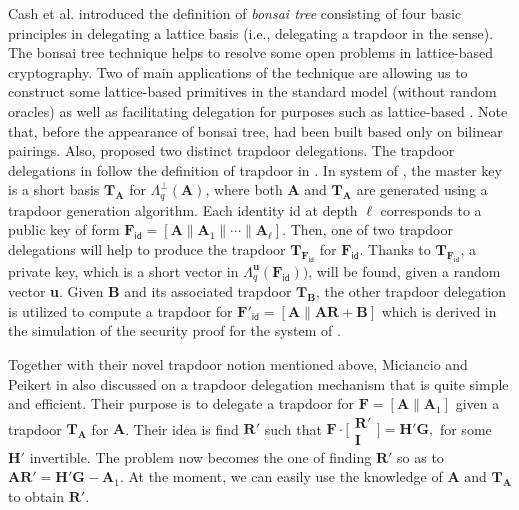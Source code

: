 \documentclass[runningheads]{llncs}
\begin{document}
Cash et al. \cite{CHKP10} introduced the definition of \textit{bonsai tree} consisting of four basic principles in delegating a lattice basis (i.e., delegating a trapdoor in the \cite{GPV08} sense). The bonsai tree technique helps to resolve some open problems in lattice-based cryptography. Two of main applications of the technique are allowing us to construct some lattice-based primitives in the standard model (without random oracles) as well as facilitating delegation for purposes such as lattice-based . Note that, before the appearance of bonsai tree,  had been built based only on bilinear pairings. Also, \cite{ABB10} proposed two distinct trapdoor delegations. The trapdoor delegations in \cite{ABB10} follow the definition of trapdoor in \cite{GPV08}. In  system of \cite{ABB10}, the master key is a short basis $\mathbf{T}_{\textbf{A}}$ for $\Lambda_q^{\bot}(\mathbf{A})$, where both $\textbf{A}$ and $\mathbf{T}_{\textbf{A}}$ are generated using a trapdoor generation algorithm. Each identity \textsf{id} at depth $\ell$ corresponds to a public key of form $\mathbf{F}_{\textsf{id}}=[\mathbf{A}\|\mathbf{A}_1 \|\cdots \| \mathbf{A}_{\ell}]$. Then, one of two trapdoor delegations will help to produce the trapdoor $\mathbf{T}_{\mathbf{F}_{\textsf{id}}}$ for $\mathbf{F}_{\textsf{id}}$. Thanks to $\mathbf{T}_{\mathbf{F}_{\textsf{id}}}$, a private key, which is a short vector in $\Lambda_q^{\textbf{u}}(\mathbf{F}_{\textsf{id}}))$, will be found, given a random vector \textbf{u}. Given  $\mathbf{B}$ and its associated trapdoor $\mathbf{T}_{\textbf{B}}$, the other trapdoor delegation is utilized to compute a trapdoor for $\mathbf{F}'_{\textsf{id}}=[\mathbf{A}\|\mathbf{A}\mathbf{R} + \mathbf{B}]$ which is derived in the simulation of the security proof for the  system of \cite{ABB10}.

Together with their novel trapdoor notion mentioned above, Miciancio and Peikert in \cite{MP12} also discussed on a trapdoor delegation mechanism that is quite simple and efficient. Their purpose is to delegate a trapdoor for $\mathbf{F}=[\mathbf{A}\|\mathbf{A}_1]$ given a trapdoor $\mathbf{T}_{\textbf{A}}$ for $\mathbf{A}$. Their idea is find $\textbf{R}'$ such that  $\mathbf{F}\cdot \bigl[ \begin{smallmatrix}
   \mathbf{R}'\\ \mathbf{I}
 \end{smallmatrix} \bigr]=\mathbf{H}'\mathbf{G},$ for some $\textbf{H}'$ invertible. The problem now becomes the one of finding $\mathbf{R}'$ so as to $\mathbf{A}\mathbf{R}'=\mathbf{H}'\mathbf{G}-\mathbf{A}_1$. At the moment, we can easily use the knowledge of $\mathbf{A}$  and $\mathbf{T}_{\textbf{A}}$ to obtain $\mathbf{R}'$.
 \fi 
\end{document}
